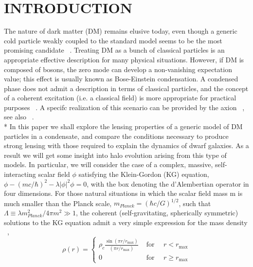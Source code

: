 \documentclass[9.5pt, twocolumn]{article}
\begin{document}
\section[I]{\centering \small INTRODUCTION}
The nature of dark matter (DM) remains elusive today,
even though a generic cold particle weakly coupled to the
standard model seems to be the most promising candidate
~\cite{Bertone_2005}. Treating DM as a bunch of classical particles is
an appropriate effective description for many physical situations. However, if DM is composed of bosons, the zero
mode can develop a non-vanishing expectation value; this
effect is usually known as Bose-Einstein condensation. A
condensed phase does not admit a description in terms
of classical particles, and the concept of a coherent excitation
(i.e. a classical field) is more appropriate for practical
purposes ~\cite{Matos_2001}. A specifc realization of this scenario
can be provided by the axion ~\cite{Sikivie_2009}, see also ~\cite{B_hm_2004}.\\*
In this paper we shall explore the lensing properties
of a generic model of DM particles in a condensate, and
compare the conditions necessary to produce strong lensing
with those required to explain the dynamics of dwarf
galaxies. As a result we will get some insight into halo
evolution arising from this type of models.
In particular, we will consider the case of a complex,
massive, self-interacting scalar field $\phi$ satisfying
the Klein-Gordon (KG) equation, $\phi-(mc/\hbar)^2-\lambda|\phi|^2\phi=0$, with the box denoting the d'Alembertian
operator in four dimensions. For those natural situations
in which the scalar field mass m is much smaller
than the Planck scale, $m_{Planck}=(\hbar c/G)^{1/2}$, such that $\Lambda\equiv\lambda m^{2}_{Planck}/4\pi m^2\gg 1$, the coherent (self-gravitating,
spherically symmetric) solutions to the KG equation admit
a very simple expression for the mass density ~\cite{Lee_1996},~\cite{Arbey_2003}
\begin{equation}
\rho(r)=\left\{\begin{array}{ccc}
\rho_{c} \frac{\sin \left(\pi r / r_{\max }\right)}{\left(\pi r / r_{\max }\right)} & \text { for } \quad r<r_{\max } \\
0 & \text { for } \quad r \geq r_{\max }
\end{array}\right.
\label{eqn:Ec1}
\end{equation}
\end{document}
